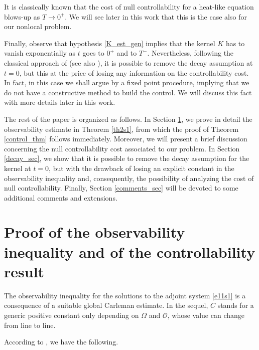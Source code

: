 \documentclass[preprint,1p]{elsarticle}
\begin{document}
It is classically known that the cost of null controllability for a heat-like equation blows-up as $T\to 0^+$. We will see later in this work that this is the case also for our nonlocal problem.

Finally, observe that hypothesis \eqref{K_est_gen} implies that the kernel $K$ has to vanish exponentially as $t$ goes to $0^+$ and to $T^-$. Nevertheless, following the classical approach of \cite{fernandez2004local} (see also \cite{tao2016null}), it is possible to remove the decay assumption at $t=0$, but this at the price of losing any information on the controllability cost. In fact, in this case we shall argue by a fixed point procedure, implying that we do not have a constructive method to build the control. We will discuss this fact with more details later in this work.  

The rest of the paper is organized as follows. In Section \ref{obs_sec}, we prove in detail the observability estimate in Theorem \ref{th2s1}, from which the proof of Theorem \ref{control_thm} follows immediately. Moreover, we will present a brief discussion concerning the null controllability cost associated to our problem. In Section \ref{decay_sec}, we show that it is possible to remove the decay assumption for the kernel at $t=0$, but with the drawback of losing an explicit constant in the observability inequality and, consequently, the possibility of analyzing the cost of null controllability. Finally, Section \ref{comments_sec} will be devoted to some additional comments and extensions.

\section{Proof of the observability inequality and of the controllability result}\label{obs_sec}
The observability inequality for the solutions to the adjoint system \eqref{e11s1} is a consequence of a suitable global Carleman estimate. In the sequel, $C$ stands for a generic positive constant only depending on $\Omega$ and ${\mathcal O}$, whose value can change from line to line.

According to \cite[Lemma 1.1]{fursikov1996controllability}, we have the following. 
\end{document}
